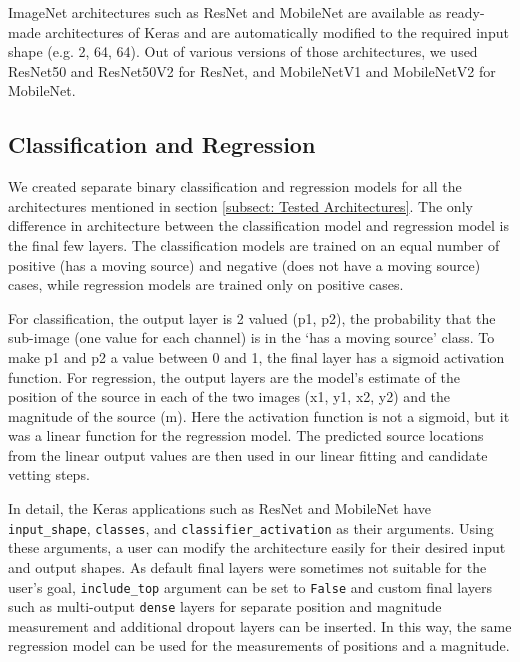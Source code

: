 ImageNet architectures such as ResNet and MobileNet are available as ready-made architectures of Keras and are automatically modified to the required input shape (e.g. 2, 64, 64).
Out of various versions of those architectures, we used ResNet50 and ResNet50V2 for ResNet, and MobileNetV1 and MobileNetV2 for MobileNet. 



\subsection{Classification and Regression}
We created separate binary classification and regression models for all the architectures mentioned in section \ref{subsect: Tested Architectures}. 
The only difference in architecture between the classification model and regression model is the final few layers.
The classification models are trained on an equal number of positive (has a moving source) and negative (does not have a moving source) cases, while regression models are trained only on positive cases.

For classification, the output layer is 2 valued (p1, p2), the probability that the sub-image (one value for each channel) is in the `has a moving source' class. 
To make p1 and p2 a value between 0 and 1, the final layer has a sigmoid activation function. 
For regression, the output layers are the model's estimate of the position of the source in each of the two images (x1, y1, x2, y2) and the magnitude of the source (m).
Here the activation function is not a sigmoid, but it was a linear function for the regression model.
The predicted source locations from the linear output values are then used in our linear fitting and candidate vetting steps.

In detail, the Keras applications such as ResNet and MobileNet have \texttt{input\_shape}, \texttt{classes}, and \texttt{classifier\_activation} as their arguments.
Using these arguments, a user can modify the architecture easily for their desired input and output shapes.
As default final layers were sometimes not suitable for the user's goal, \texttt{include\_top} argument can be set to \texttt{False} and custom final layers such as multi-output \texttt{dense} layers for separate position and magnitude measurement and additional dropout layers can be inserted.
In this way, the same regression model can be used for the measurements of positions and a magnitude.

